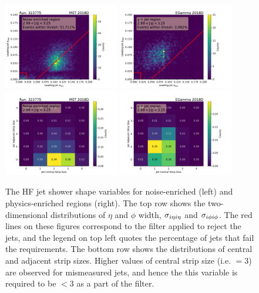 \begin{figure}[htbp]
    \centering
    \includegraphics[width=0.45\textwidth]{HFFilter/merged_2022-04-11_hlt_11Apr22_MET_2018D/MET_2018D_sieie_sipip_ak4_abseta0_2_99_3_25_noise_enriched_mht_110.pdf}
    \includegraphics[width=0.45\textwidth]{HFFilter/merged_2022-04-12_hlt_11Apr22_EGamma_2018D/EGamma_2018D_sieie_sipip_ak4_abseta0_2_99_3_25_gammajet.pdf} \\
    \includegraphics[width=0.45\textwidth]{HFFilter/merged_2022-04-11_hlt_11Apr22_MET_2018D/MET_2018D_cssize_adssize_ak4_abseta0_2_99_3_25_noise_enriched_mht_110.pdf}
    \includegraphics[width=0.45\textwidth]{HFFilter/merged_2022-04-12_hlt_11Apr22_EGamma_2018D/EGamma_2018D_cssize_adssize_ak4_abseta0_2_99_3_25_gammajet.pdf}
    \caption{The HF jet shower shape variables for noise-enriched (left) and physics-enriched regions (right).
    The top row shows the two-dimensional distributions of $\eta$ and $\phi$ width, $\sigma_{i\eta i\eta}$ and $\sigma_{i\phi i\phi}$. The red lines on these
    figures correspond to the filter applied to reject the jets, and the legend on top left quotes the percentage of jets that fail the requirements.
    The bottom row shows the distributions of central and adjacent strip sizes. Higher values of central strip size (i.e. $=3$) are observed for mismeasured
    jets, and hence the this variable is required to be $< 3$ as a part of the filter.}
    \label{fig:hf_variables_hlt}
\end{figure}

